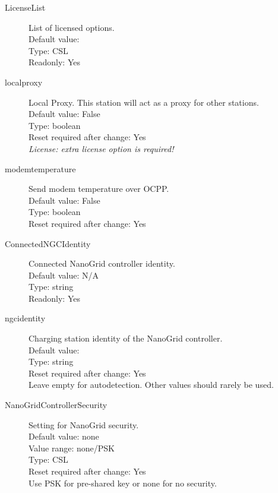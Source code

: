 \begin{description}
\item[LicenseList] List of licensed options.\\
  Default value: \\
  Type: CSL\\
  Readonly: Yes\\

\item[localproxy] Local Proxy. This station will act as a proxy for other stations.\\
  Default value: False\\
  Type: boolean\\
  Reset required after change: Yes\\
  \emph{License: extra license option is required!}\\

\item[modemtemperature] Send modem temperature over OCPP.\\
  Default value: False\\
  Type: boolean\\
  Reset required after change: Yes\\

\item[ConnectedNGCIdentity] Connected NanoGrid controller identity.\\
  Default value: N/A\\
  Type: string\\
  Readonly: Yes\\

\item[ngcidentity] Charging station identity of the NanoGrid controller.\\
  Default value: \\
  Type: string\\
  Reset required after change: Yes\\
  Leave empty for autodetection. Other values should rarely be used.\\

\item[NanoGridControllerSecurity] Setting for NanoGrid security.\\
  Default value: none\\
  Value range: none/PSK\\
  Type: CSL\\
  Reset required after change: Yes\\
  Use PSK for pre-shared key or none for no security.\\


\end{description}
